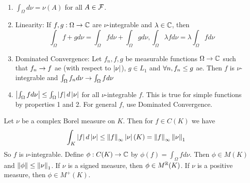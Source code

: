 \documentclass{article}
\begin{document}
\begin{prop}~
  \begin{enumerate}
    \item $\int_\Omega d\nu = \nu(A)$ for all $A \in \mathcal F$.
    \item Linearity: If $f, g : \Omega \rightarrow \mathbb C$ are $\nu$-integrable and $\lambda \in \mathbb C$, then
    $$\int_\Omega f + g d\nu = \int_\Omega fd\nu + \int_\Omega gd\nu, \int_\Omega \lambda fd\nu = \lambda \int_\Omega fd\nu$$
  \item Dominated Convergence: Let $f_n, f, g$ be measurable functions $\Omega \rightarrow \mathbb C$ such that $f_n \rightarrow f$ ae (with respect to $\left\lvert \nu\right\rvert$), $g \in L_1$ and $\forall n, f_n \le g$ ae. Then $f$ is $\nu$-integrable and $\int_\Omega f_n d\nu \rightarrow \int_\Omega f d\nu$
  \item $\left\lvert \int_\Omega f d\nu\right\rvert \le \int_\Omega \left\lvert f\right\rvert d\left\lvert \nu\right\rvert$ for all $\nu$-integrable $f$. This is true for simple functions by properties 1 and 2. For general $f$, use Dominated Convergence.
  \end{enumerate}
\end{prop}

Let $\nu$ be a complex Borel measure on $K$. Then for $f \in C(K)$ we have
$$\int_K \left\lvert f\right\rvert d\left\lvert \nu\right\rvert \le \left\lVert f\right\rVert_\infty \left\lvert \nu\right\rvert(K) = \left\lVert f\right\rVert_\infty \left\lVert \nu\right\rVert_1$$
So $f$ is $\nu$-integrable. Define $\phi : C(K) \rightarrow \mathbb C$ by $\phi(f) = \int_\Omega f d\nu$. Then $\phi \in M(K)$ and $\left\lVert \phi\right\rVert \le \left\lVert \nu\right\rVert_1$. If $\nu$ is a signed measure, then $\phi \in M^\mathbb R(K)$. If $\nu$ is a positive measure, then $\phi \in M^+(K)$.
\end{document}
